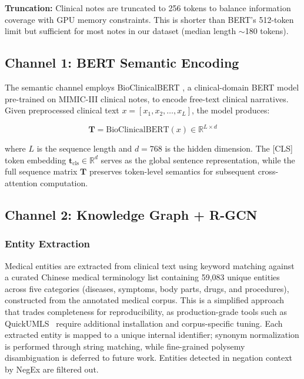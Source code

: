 \documentclass[11pt,onecolumn,a4paper]{article}
\begin{document}
\textbf{Truncation:} Clinical notes are truncated to 256 tokens to balance information coverage with GPU memory constraints. This is shorter than BERT's 512-token limit but sufficient for most notes in our dataset (median length $\sim$180 tokens).

\subsection{Channel 1: BERT Semantic Encoding}

The semantic channel employs BioClinicalBERT \cite{alsentzer2019}, a clinical-domain BERT model pre-trained on MIMIC-III clinical notes, to encode free-text clinical narratives. Given preprocessed clinical text $x = [x_1, x_2, \ldots, x_L]$, the model produces:

\begin{equation}\label{eq:1}
    \mathbf{T} = \text{BioClinicalBERT}(x) \in \mathbb{R}^{L \times d}
\end{equation}

where $L$ is the sequence length and $d = 768$ is the hidden dimension. The [CLS] token embedding $\mathbf{t}_{\text{cls}} \in \mathbb{R}^d$ serves as the global sentence representation, while the full sequence matrix $\mathbf{T}$ preserves token-level semantics for subsequent cross-attention computation.

\subsection{Channel 2: Knowledge Graph + R-GCN}

\subsubsection{Entity Extraction}

Medical entities are extracted from clinical text using keyword matching against a curated Chinese medical terminology list containing 59,083 unique entities across five categories (diseases, symptoms, body parts, drugs, and procedures), constructed from the annotated medical corpus. This is a simplified approach that trades completeness for reproducibility, as production-grade tools such as QuickUMLS~\cite{soldaini2016quickumls} require additional installation and corpus-specific tuning. Each extracted entity is mapped to a unique internal identifier; synonym normalization is performed through string matching, while fine-grained polysemy disambiguation is deferred to future work. Entities detected in negation context by NegEx are filtered out.
\end{document}
